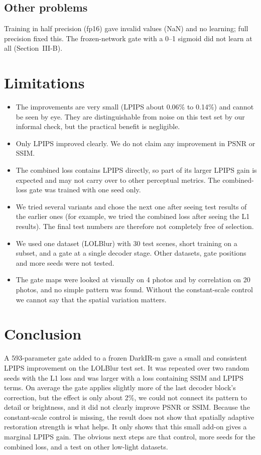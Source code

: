 \documentclass[conference]{IEEEtran}
\begin{document}
\subsection{Other problems}
Training in half precision (fp16) gave invalid values (NaN) and no learning; full precision fixed this. The frozen-network gate with a 0--1 sigmoid did not learn at all (Section~III-B).

\section{Limitations}
\begin{itemize}
\item The improvements are very small (LPIPS about 0.06\% to 0.14\%) and cannot be seen by eye. They are distinguishable from noise on this test set by our informal check, but the practical benefit is negligible.
\item Only LPIPS improved clearly. We do not claim any improvement in PSNR or SSIM.
\item The combined loss contains LPIPS directly, so part of its larger LPIPS gain is expected and may not carry over to other perceptual metrics. The combined-loss gate was trained with one seed only.
\item We tried several variants and chose the next one after seeing test results of the earlier ones (for example, we tried the combined loss after seeing the L1 results). The final test numbers are therefore not completely free of selection.
\item We used one dataset (LOLBlur) with 30 test scenes, short training on a subset, and a gate at a single decoder stage. Other datasets, gate positions and more seeds were not tested.
\item The gate maps were looked at visually on 4 photos and by correlation on 20 photos, and no simple pattern was found. Without the constant-scale control we cannot say that the spatial variation matters.
\end{itemize}

\section{Conclusion}
A 593-parameter gate added to a frozen DarkIR-m gave a small and consistent LPIPS improvement on the LOLBlur test set. It was repeated over two random seeds with the L1 loss and was larger with a loss containing SSIM and LPIPS terms. On average the gate applies slightly more of the last decoder block's correction, but the effect is only about 2\%, we could not connect its pattern to detail or brightness, and it did not clearly improve PSNR or SSIM. Because the constant-scale control is missing, the result does not show that spatially adaptive restoration strength is what helps. It only shows that this small add-on gives a marginal LPIPS gain. The obvious next steps are that control, more seeds for the combined loss, and a test on other low-light datasets.
\end{document}
